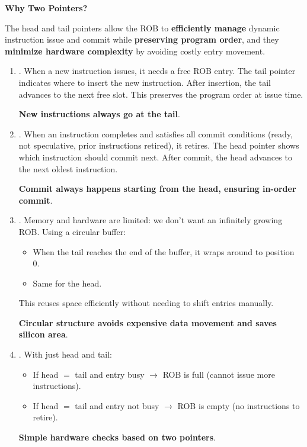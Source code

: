\highspace
\begin{flushleft}
    \textcolor{Green3}{ \textbf{Why Two Pointers?}}
\end{flushleft}
The head and tail pointers allow the ROB to \textbf{efficiently manage} dynamic instruction issue and commit while \textbf{preserving program order}, and they \textbf{minimize hardware complexity} by avoiding costly entry movement.
\begin{enumerate}
    \item {}. When a new instruction issues, it needs a free ROB entry. The tail pointer indicates where to insert the new instruction. After insertion, the tail advances to the next free slot. This preserves the program order at issue time.

    \textbf{New instructions always go at the tail}.


    \item {}.  When an instruction completes and satisfies all commit conditions (ready, not speculative, prior instructions retired), it retires. The head pointer shows which instruction should commit next. After commit, the head advances to the next oldest instruction.
    
    \textbf{Commit always happens starting from the head, ensuring in-order commit}.
    

    \newpage
    
    
    \item {}.  Memory and hardware are limited: we don't want an infinitely growing ROB. Using a circular buffer:
    \begin{itemize}
        \item When the tail reaches the end of the buffer, it wraps around to position 0.
        \item Same for the head.
    \end{itemize}
    This reuses space efficiently without needing to shift entries manually.
    
    \textbf{Circular structure avoids expensive data movement and saves silicon area}.
    
    
    \item {}. With just head and tail:
    \begin{itemize}
        \item If head $=$ tail and entry busy $\rightarrow$ ROB is full (cannot issue more instructions).
        \item If head $=$ tail and entry not busy $\rightarrow$ ROB is empty (no instructions to retire).
    \end{itemize}
    
    \textbf{Simple hardware checks based on two pointers}.
\end{enumerate}